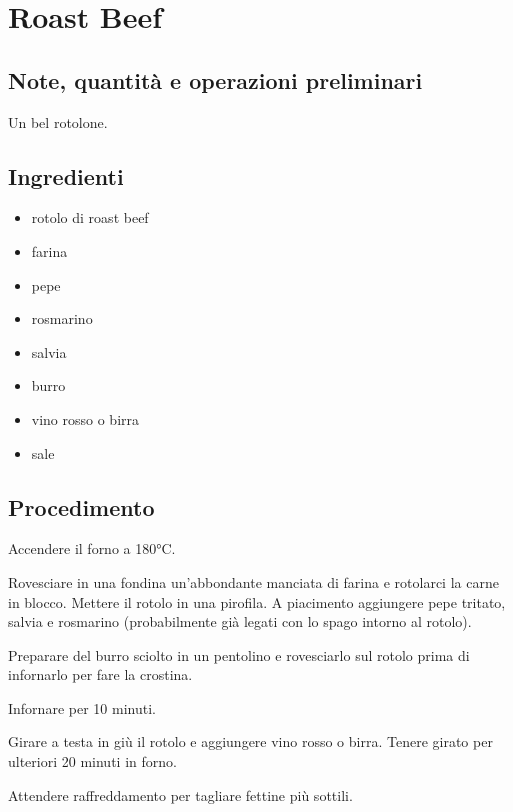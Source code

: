 \documentclass[12pt]{article}
\begin{document}
\section{Roast Beef}

\subsection*{Note, quantità e operazioni preliminari}
Un bel rotolone.

\bigskip
\bigskip

\begin{multicols}{2}
\subsection*{Ingredienti}
\begin{itemize}
	\item rotolo di roast beef
	\item farina
	\item pepe
	\item rosmarino
	\item salvia
	\item burro
	\item vino rosso o birra
	\item sale
\end{itemize}

\vspace*{\fill}

\columnbreak
\subsection*{Procedimento}

Accendere il forno a 180°C.
\medskip

Rovesciare in una fondina un'abbondante manciata di farina e
rotolarci la carne in blocco.
Mettere il rotolo in una pirofila.
A piacimento aggiungere pepe tritato,
salvia e rosmarino (probabilmente già legati con lo spago intorno al rotolo).
\medskip

Preparare del burro sciolto in un pentolino e rovesciarlo sul rotolo prima di infornarlo
per fare la crostina.
\medskip

Infornare per 10 minuti.
\medskip

Girare a testa in giù il rotolo e aggiungere vino rosso o birra.
Tenere girato per ulteriori 20 minuti in forno.
\medskip

Attendere raffreddamento per tagliare fettine più sottili.

\end{multicols}
\end{document}

